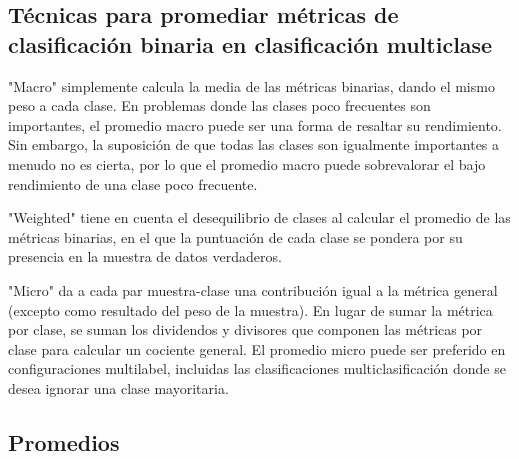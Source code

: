 \subsection{Técnicas para promediar métricas de clasificación binaria en clasificación multiclase}

"Macro" simplemente calcula la media de las métricas binarias, dando el mismo peso a cada clase. En problemas donde las clases poco frecuentes son importantes, el promedio macro puede ser una forma de resaltar su rendimiento. Sin embargo, la suposición de que todas las clases son igualmente importantes a menudo no es cierta, por lo que el promedio macro puede sobrevalorar el bajo rendimiento de una clase poco frecuente.

"Weighted" tiene en cuenta el desequilibrio de clases al calcular el promedio de las métricas binarias, en el que la puntuación de cada clase se pondera por su presencia en la muestra de datos verdaderos.

"Micro" da a cada par muestra-clase una contribución igual a la métrica general (excepto como resultado del peso de la muestra). En lugar de sumar la métrica por clase, se suman los dividendos y divisores que componen las métricas por clase para calcular un cociente general. El promedio micro puede ser preferido en configuraciones multilabel, incluidas las clasificaciones multiclasificación donde se desea ignorar una clase mayoritaria.

\subsection{Promedios}

